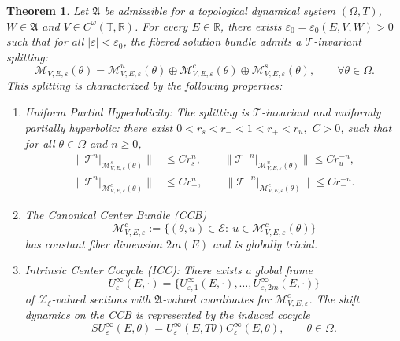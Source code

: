 \documentclass[reqno,11pt]{amsart}
\newtheorem{theorem}{Theorem}[section]
\begin{document}
\begin{theorem}
\label{thm:center_reduction}
Let  $\mathfrak A$ be admissible for a topological dynamical system $(\Omega,T)$,  $W\in\mathfrak A$  and  $V \in C^{\omega}(\mathbb{T}, \mathbb{R})$. For every $E \in \mathbb{R}$, there exists $\varepsilon_0=\varepsilon_0(E,V,W) > 0$ such that for all $|\varepsilon| < \varepsilon_0$, the fibered solution bundle admits a  $\mathscr{T}$-invariant splitting:
$$
\mathcal{M}_{V,E,\varepsilon}(\theta)=
\mathcal{M}_{V,E,\varepsilon}^u(\theta)
\oplus\mathcal{M}_{V,E,\varepsilon}^c(\theta)
\oplus\mathcal{M}_{V,E,\varepsilon}^s(\theta),
\qquad \forall \theta \in \Omega.
$$
This splitting is characterized by the following properties:
\begin{enumerate}
\item \emph{Uniform Partial Hyperbolicity:}
  The splitting is $\mathscr T$-invariant and uniformly partially hyperbolic: there exist
$0<r_s<r_-<1<r_+<r_u, $ $C>0$,
such that for all $\theta\in\Omega$ and $n\ge0$,
\begin{equation*}
    \begin{aligned}
        \bigl\| \mathscr{T}^n \big|_{\mathcal{M}_{V,E,\varepsilon}^s(\theta)} \bigr\| &\le C r_s^n, \qquad
        \bigl\| \mathscr{T}^{-n} \big|_{\mathcal{M}_{V,E,\varepsilon}^u(\theta)} \bigr\| \le C r_u^{-n}, \\
        \bigl\| \mathscr{T}^n \big|_{\mathcal{M}_{V,E,\varepsilon}^c(\theta)} \bigr\| &\le C r_+^n, \qquad \bigl\| \mathscr{T}^{-n} \big|_{\mathcal{M}_{V,E,\varepsilon}^c(\theta)} \bigr\| \le C r_-^{-n}.
    \end{aligned}
    \end{equation*}
    \item The \emph{Canonical Center Bundle (CCB)}
    $$
\boldsymbol{\mathcal M}^c_{V,E,\varepsilon}:=
\bigl\{(\theta,u)\in\mathcal E:\ u\in\mathcal M^c_{V,E,\varepsilon}(\theta)\bigr\}
$$
 has constant fiber dimension $2m(E)$ and is globally trivial.
 \item  \emph{{Intrinsic Center Cocycle (ICC)}:} There exists a global frame
$$U^\infty_{\varepsilon}(E,\cdot)=\bigl\{
U^\infty_{\varepsilon,1}(E,\cdot),\dots,
U^\infty_{\varepsilon,2m}(E,\cdot)\bigr\}$$
of $\mathcal X_\xi$-valued sections with $\mathfrak A$-valued coordinates for
$\boldsymbol{\mathcal M}^c_{V,E,\varepsilon}$.
The shift dynamics on the CCB is represented by the induced cocycle
$$
S U^\infty_\varepsilon(E,\theta)=U^\infty_\varepsilon(E,T\theta)C^\infty_\varepsilon(E,\theta),
\qquad \theta\in\Omega.
$$
\end{enumerate}
\end{theorem}
\end{document}
